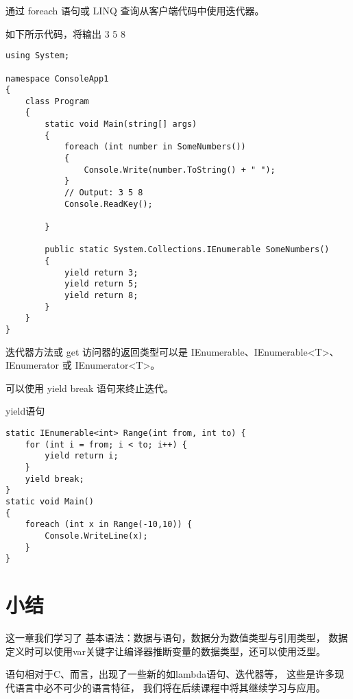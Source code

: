 通过 foreach 语句或 LINQ 查询从客户端代码中使用迭代器。

如下所示代码，将输出 3 5 8

\begin{lstlisting}
using System;

namespace ConsoleApp1
{
    class Program
    {
        static void Main(string[] args)
        {
            foreach (int number in SomeNumbers())
            {
                Console.Write(number.ToString() + " ");
            }
            // Output: 3 5 8
            Console.ReadKey();

        }

        public static System.Collections.IEnumerable SomeNumbers()
        {
            yield return 3;
            yield return 5;
            yield return 8;
        }
    }
}
\end{lstlisting}

迭代器方法或 get 访问器的返回类型可以是 IEnumerable、IEnumerable<T>、IEnumerator 或 IEnumerator<T>。

可以使用 yield break 语句来终止迭代。

yield语句

\begin{lstlisting}
static IEnumerable<int> Range(int from, int to) {
    for (int i = from; i < to; i++) {
        yield return i;
    }
    yield break;
}
static void Main()
{
    foreach (int x in Range(-10,10)) {
        Console.WriteLine(x);
    }
}
\end{lstlisting}



\section{小结}
这一章我们学习了 \cs 基本语法：数据与语句，数据分为数值类型与引用类型，
数据定义时可以使用var关键字让编译器推断变量的数据类型，还可以使用泛型。

\cs 语句相对于C、\cpp 而言，出现了一些新的如lambda语句、迭代器等，
这些是许多现代语言中必不可少的语言特征，
我们将在后续课程中将其继续学习与应用。


